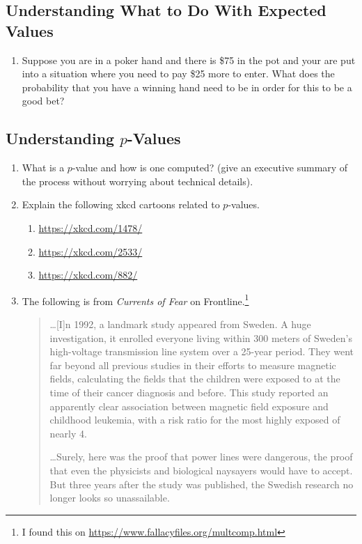 \documentclass[11pt, letterpaper]{article}
\begin{document}
\subsection{Understanding What to Do With Expected Values}
\begin{enumerate}
	\item Suppose you are in a poker hand and there is \$75 in the pot and your are put into a situation where you need to pay \$25 more to enter. 
	What does the probability that you have a winning hand need to be in order for this to be a good bet?	
\end{enumerate}

\subsection{Understanding $p$-Values}
\begin{enumerate}
	\item What is a $p$-value and how is one computed? (give an executive summary of the process without worrying about technical details).
	\item Explain the following xkcd cartoons related to $p$-values.
	\begin{enumerate}
		\item \url{https://xkcd.com/1478/}
		\item \url{https://xkcd.com/2533/}
		\item \url{https://xkcd.com/882/}
	\end{enumerate}
	\item 
	The following is from \emph{Currents of Fear} on Frontline.\footnote{I found this on \url{https://www.fallacyfiles.org/multcomp.html}}
	\begin{quote}
		…[I]n 1992, a landmark study appeared from Sweden. A huge investigation, it enrolled everyone living within 300 meters of Sweden's high-voltage transmission line system over a 25-year period. They went far beyond all previous studies in their efforts to measure magnetic fields, calculating the fields that the children were exposed to at the time of their cancer diagnosis and before. This study reported an apparently clear association between magnetic field exposure and childhood leukemia, with a risk ratio for the most highly exposed of nearly 4.
		
		…Surely, here was the proof that power lines were dangerous, the proof that even the physicists and biological naysayers would have to accept. But three years after the study was published, the Swedish research no longer looks so unassailable. 
		

\end{quote}
\end{enumerate}
\end{document}
